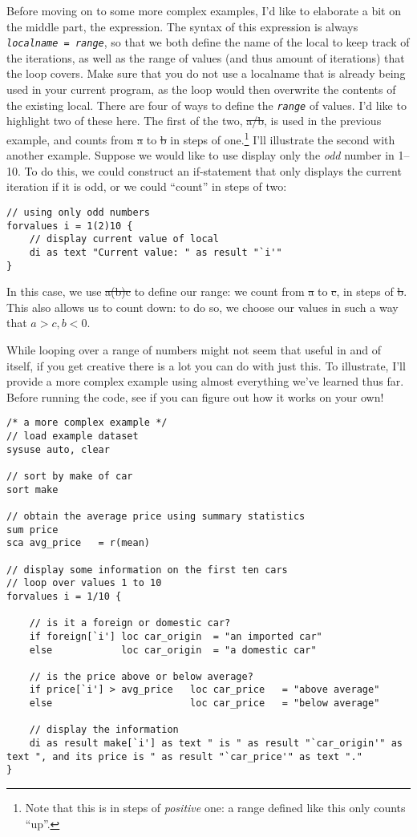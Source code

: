 Before moving on to some more complex examples,
I'd like to elaborate a bit on the middle part, the expression.
The syntax of this expression is always \texttt{\textit{localname} = \textit{range}},
so that we both define the name of the local to keep track of the iterations,
as well as the range of values (and thus amount of iterations) that the loop covers.
Make sure that you do not use a localname that is already being used in your current program,
as the loop would then overwrite the contents of the existing local.
There are four of ways to define the \texttt{\textit{range}} of values.
I'd like to highlight two of these here.
The first of the two, \st{a/b}, is used in the previous example,
and counts from \st{a} to \st{b} in steps of one.\footnote{%
Note that this is in steps of \emph{positive} one: a range defined like this only counts ``up''.}
I'll illustrate the second with another example.
Suppose we would like to use display only the \emph{odd} number in 1--10.
To do this, we could construct an if-statement that only displays the current iteration if it is odd,
or we could ``count'' in steps of two:
\begin{verbatim}
// using only odd numbers
forvalues i = 1(2)10 {
    // display current value of local
    di as text "Current value: " as result "`i'"
}
\end{verbatim}
In this case, we use \st{a(b)c} to define our range:
we count from \st{a} to \st{c}, in steps of \st{b}.
This also allows us to count down: to do so,
we choose our values in such a way that $a>c, b<0$.

While looping over a range of numbers might not seem that useful in and of itself,
if you get creative there is a lot you can do with just this.
To illustrate, I'll provide a more complex example using almost everything we've learned thus far.
Before running the code,
see if you can figure out how it works on your own!
\begin{verbatim}
/* a more complex example */
// load example dataset
sysuse auto, clear

// sort by make of car
sort make

// obtain the average price using summary statistics
sum price
sca avg_price   = r(mean)

// display some information on the first ten cars
// loop over values 1 to 10
forvalues i = 1/10 {

    // is it a foreign or domestic car?
    if foreign[`i'] loc car_origin  = "an imported car"
    else            loc car_origin  = "a domestic car"

    // is the price above or below average?
    if price[`i'] > avg_price   loc car_price   = "above average"
    else                        loc car_price   = "below average"

    // display the information
    di as result make[`i'] as text " is " as result "`car_origin'" as text ", and its price is " as result "`car_price'" as text "."
}
\end{verbatim}

